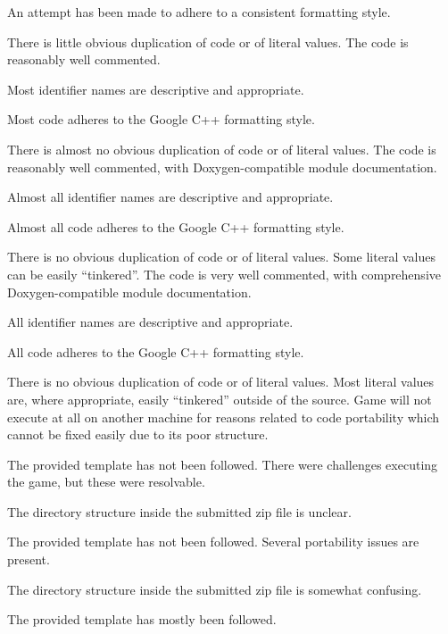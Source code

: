 \documentclass{../fal_assignment}
\begin{document}
\begin{markingrubric}
            \par An attempt has been made to adhere to a consistent formatting style.
             \par There is little obvious duplication of code or of literal values.           
        \grade The code is reasonably well commented.
            \par Most identifier names are descriptive and appropriate.
            \par Most code adheres to the Google C++ formatting style.
             \par There is almost no obvious duplication of code or of literal values.   
        \grade The code is reasonably well commented, with Doxygen-compatible module documentation.
            \par Almost all identifier names are descriptive and appropriate.
            \par Almost all code adheres to the Google C++ formatting style.
             \par There is no obvious duplication of code or of literal values. Some literal values can be easily ``tinkered''. 
        \grade The code is very well commented, with comprehensive Doxygen-compatible module documentation.
            \par All identifier names are descriptive and appropriate.
            \par All code adheres to the Google C++ formatting style.
             \par There is no obvious duplication of code or of literal values. Most literal values are, where appropriate, easily ``tinkered'' outside of the source.  
%
        \grade\fail Game will not execute at all on another machine for reasons related to code portability which cannot be fixed easily due to its poor structure.
            \par The provided template has not been followed.
        \grade There were challenges executing the game, but these were resolvable.
            \par The directory structure inside the submitted zip file is unclear.
            \par The provided template has not been followed.
        \grade Several portability issues are present.
            \par The directory structure inside the submitted zip file is somewhat confusing.
            \par The provided template has mostly been followed.

\end{markingrubric}
\end{document}
